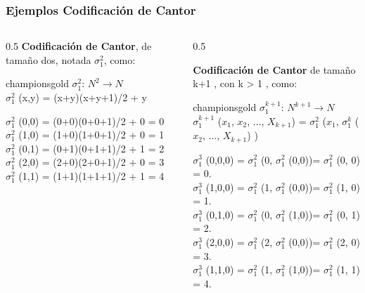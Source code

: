 \documentclass[xcolor=table]{beamer}
\begin{document}
\begin{frame}[fragile]\frametitle{Ejemplos Codificación de Cantor} \scriptsize


\begin{columns}

    \begin{column}{0.5\textwidth}
     \textbf{Codificación de Cantor}, de tamaño dos, notada $\sigma_1^2$, como:

         \begin{colorblock}[black]{championsgold}{}\scriptsize
        $\sigma_1^2$: $N^2 \rightarrow N$\\
            $\sigma_1^2$ (x,y) = (x+y)(x+y+1)/2 + y
        \end{colorblock}

    $\sigma_1^2$ (0,0) = (0+0)(0+0+1)/2 + 0 = 0\\
    $\sigma_1^2$ (1,0) = (1+0)(1+0+1)/2 + 0 = 1\\
    $\sigma_1^2$ (0,1) = (0+1)(0+1+1)/2 + 1 = 2\\ 
    $\sigma_1^2$ (2,0) = (2+0)(2+0+1)/2 + 0 = 3\\ 
    $\sigma_1^2$ (1,1) = (1+1)(1+1+1)/2 + 1 = 4\\ 
    

    \end{column}

    \begin{column}{0.5\textwidth}

    \textbf{Codificación de Cantor} de tamaño k+1 , con k > 1 , como:
        
        
        \begin{colorblock}[black]{championsgold}{}\scriptsize
        $\sigma_1^{k+1}$: $N^{k+1} \rightarrow N$\\
        $\sigma_1^{k+1}$ ($x_1$, $x_2$, $\ldots$, $X_{k+1}$) = $\sigma_1^2$ ($x_1$, $\sigma_1^k$ ($x_2$, $\ldots$, $X_{k+1}$) )
        \end{colorblock}

        $\sigma_1^3$ (0,0,0) = $\sigma_1^2$ (0, $\sigma_1^2$ (0,0))= $\sigma_1^2$ (0, 0) = 0.\\
        $\sigma_1^3$ (1,0,0) = $\sigma_1^2$ (1, $\sigma_1^2$ (0,0))= $\sigma_1^2$ (1, 0) = 1.\\
        $\sigma_1^3$ (0,1,0) = $\sigma_1^2$ (0, $\sigma_1^2$ (1,0))= $\sigma_1^2$ (0, 1) = 2.\\
        $\sigma_1^3$ (2,0,0) = $\sigma_1^2$ (2, $\sigma_1^2$ (0,0))= $\sigma_1^2$ (2, 0) = 3.\\
        $\sigma_1^3$ (1,1,0) = $\sigma_1^2$ (1, $\sigma_1^2$ (1,0))= $\sigma_1^2$ (1, 1) = 4.\\
    \end{column}
    
\end{columns}

\end{frame}
\end{document}

